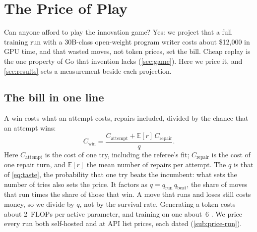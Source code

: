 \section{The Price of Play}\label{sec:price}

Can anyone afford to play the innovation game? Yes: we project that a full
training run with a 30B-class open-weight program writer costs about \$12,000
in GPU time, and that wasted moves, not token prices, set the bill. Cheap
replay is the one property of Go that invention lacks (\cref{sec:game}). Here
we price it, and \cref{sec:results} sets a measurement beside each projection.

\subsection{The bill in one line}\label{sub:price-bill}

A win costs what an attempt costs, repairs included, divided by the chance
that an attempt wins:
\begin{equation}
  C_{\text{win}} = \frac{C_{\text{attempt}} + \mathbb{E}[r]\,C_{\text{repair}}}{q}.
  \label{eq:bill}
\end{equation}
Here $C_{\text{attempt}}$ is the cost of one try, including the referee's
fit; $C_{\text{repair}}$ is the cost of one repair turn, and $\mathbb{E}[r]$
the mean number of repairs per attempt. The $q$ is that of \cref{eq:taste},
the probability that one try beats the incumbent: what sets the number of
tries also sets the price. It factors as $q = q_{\text{run}}\,q_{\text{beat}}$,
the share of moves that run times the share of those that win. A move that
runs and loses still costs money, so we divide by $q$, not by the survival
rate. Generating a token costs about 2~FLOPs per active parameter, and
training on one about~6 \citep{kaplan2020scaling}. We price every run both
self-hosted and at API list prices, each dated (\cref{sub:price-run}).

